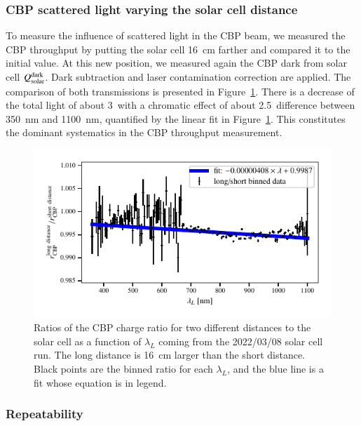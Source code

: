 \subsubsection{CBP scattered light varying the solar cell distance}

To measure the influence of scattered light in the CBP beam, we measured the CBP throughput by putting the solar cell \SI{16}{\cm} farther and compared it to the initial value. At this new position, we measured again the CBP dark from solar cell $Q_{\mathrm{solar}}^{\rm dark}$. Dark subtraction and laser contamination correction are applied. The comparison of both transmissions is presented in Figure~\ref{fig:sc_distance}. There is a decrease of the total light of about 3\textperthousand\ with a chromatic effect of about 2.5\textperthousand\ difference between \SI{350}{\nano\meter} and \SI{1100}{\nano\meter}, quantified by the linear fit in Figure~\ref{fig:sc_distance}. This constitutes the dominant systematics in the CBP throughput measurement.

\begin{figure}[h]
    \centering
    \includegraphics[width=\columnwidth]{fig/sc_distance.pdf}
    \caption{Ratios of the CBP charge ratio for two different distances to the solar cell as a function of $\lambda_L$ coming from the 2022/03/08 solar cell run. The long distance is \SI{16}{\cm} larger than the short distance. Black points are the binned ratio for each $\lambda_L$, and the blue line is a fit whose equation is in legend.}
    \label{fig:sc_distance}
\end{figure}

\subsubsection{Repeatability}

